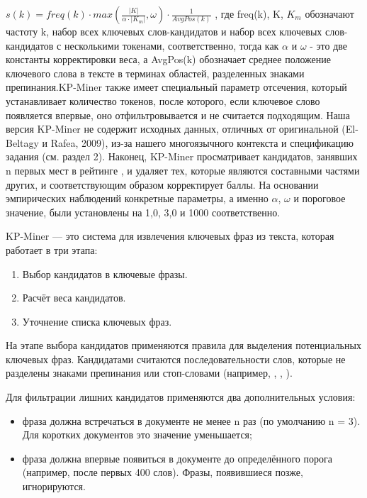 \documentclass[bachelor, och, diploma ]{SCWorks}
\begin{document}
$s(k) = freq(k)\cdot max( \frac{|K|}{\alpha \cdot |K_m|}, \omega) \cdot \frac{1}{AvgPos(k)}$ , 
где freq(k), K, $K_m$ обозначают частоту k, набор всех ключевых слов-кандидатов и набор всех ключевых слов-кандидатов с несколькими токенами, соответственно, тогда как $\alpha$ и $\omega$ - это две константы корректировки веса, а AvgPos(k) обозначает среднее положение ключевого слова в тексте в терминах областей, разделенных знаками препинания.KP-Miner также имеет специальный параметр отсечения, который устанавливает количество токенов, после которого, если ключевое слово появляется впервые, оно отфильтровывается и не считается подходящим.
Наша версия KP-Miner не содержит исходных данных, отличных от оригинальной (El-Beltagy
и Rafea, 2009), из-за нашего многоязычного контекста
и спецификацию задания (см. раздел 2). Наконец, KP-Miner просматривает кандидатов, занявших n первых мест в рейтинге
, и удаляет тех, которые являются составными частями
других, и соответствующим образом корректирует баллы. На
основании эмпирических наблюдений конкретные параметры,
а именно $\alpha$, $\omega$ и пороговое значение, были установлены на 1,0, 3,0 и
1000 соответственно.





KP-Miner — это система для извлечения ключевых фраз из текста, которая работает в три этапа:  
\begin{enumerate}
    \item Выбор кандидатов в ключевые фразы.
    \item Расчёт веса кандидатов.
    \item Уточнение списка ключевых фраз.
\end{enumerate}

На этапе выбора кандидатов применяются правила для выделения потенциальных ключевых фраз. Кандидатами считаются последовательности слов, которые не разделены знаками препинания или стоп-словами (например, \textquotedbl, \textquotedbl, \textquotedbl). 

Для фильтрации лишних кандидатов применяются два дополнительных условия:  
\begin{itemize}
    \item фраза должна встречаться в документе не менее n раз (по умолчанию n = 3). Для коротких документов это значение уменьшается;
    \item фраза должна впервые появиться в документе до определённого порога (например, после первых 400 слов). Фразы, появившиеся позже, игнорируются.  
\end{itemize}
\end{document}
